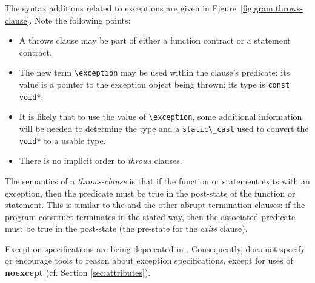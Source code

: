 The syntax additions related to exceptions are given in 
Figure~\ref{fig:gram:throws-clause}. Note the following points:
\begin{itemize}
\item A throws clause may be part of either a function contract or a statement contract.
\item The new term \lstinline|\exception| may be used within the clause's predicate; its value is a pointer to the exception object being thrown; its type is \lstinline|const void*|.
\item It is likely that to use the value of \lstinline|\exception|,
some additional information will be needed to determine the type and a
\lstinline|static\_cast| used to convert the \lstinline|void*| to a 
usable type.
\item There is no implicit order to \textsl{throws} clauses.
\end{itemize}
The semantics of a \textsl{throws-clause} is that if the function or statement exits with an exception, then the predicate must be true in the post-state of the function or statement. This is similar to the \ensures and the other abrupt termination clauses: if the program construct terminates in the stated way, then the associated predicate must be true in the post-state (the pre-state for the \textsl{exits} clause).

Exception specifications are being deprecated in \lang. Consequently, \NAME does not specify or encourage tools to reason about \lang exception specifications, except for  uses of \textbf{noexcept} (cf. Section \ref{sec:attributes}).


